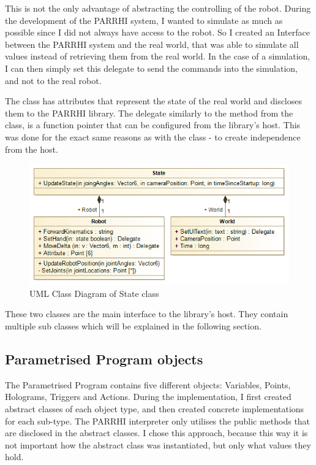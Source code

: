 This is not the only advantage of abstracting the controlling of the robot. During the development of the PARRHI system, I wanted to simulate as much as possible since I did not always have access to the robot. So I created an Interface between the PARRHI system and the real world, that was able to simulate all values instead of retrieving them from the real world. In the case of a simulation, I can then simply set this delegate to send the commands into the simulation, and not to the real robot.  

The  class has attributes that represent the state of the real world and discloses them to the PARRHI library. The  delegate similarly to the  method from the  class, is a function pointer that can be configured from the library's host. This was done for the exact same reasons as with the  class - to create independence from the host.

\begin{figure}[!h]
	\centering
	\includegraphics[width=0.7\linewidth]{Figures/Implementation_State}
	\caption[UML Class Diagram of State class]{UML Class Diagram of State class}
	\label{Fig:ImplementationState}
\end{figure}

These two classes are the main interface to the library's host. They contain multiple sub classes which will be explained in the following section.

\subsection{Parametrised Program objects}
The Parametrised Program contains five different objects: Variables, Points, Holograms, Triggers and Actions. During the implementation, I first created abstract classes of each object type, and then created concrete implementations for each sub-type. The PARRHI interpreter only utilises the public methods that are disclosed in the abstract classes. I chose this approach, because this way it is not important how the abstract class was instantiated, but only what values they hold.

